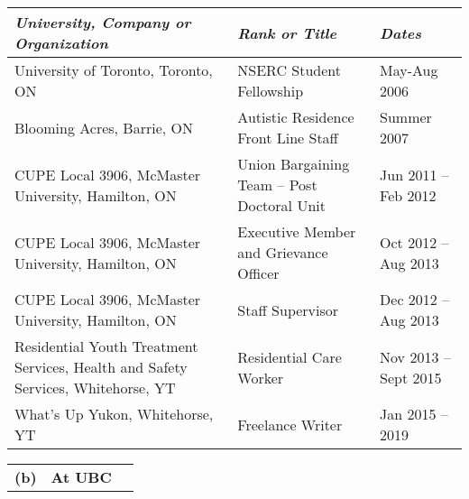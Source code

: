 \documentclass[11pt,notitlepage,english]{report}
\begin{document}
\begin{table}[H]
  \label{6. Employment Record}
  \begin{tabularx}{1\textwidth}{|p{8cm}|p{5cm}|X|}
    \hline
    \textit{University, Company or Organization}                                     & \textit{Rank or Title}                     & \textit{Dates}       \\
    \hline
    University of Toronto, Toronto, ON                                               & NSERC Student Fellowship                   & May-Aug 2006         \\
    \hline
    Blooming Acres, Barrie, ON                                                       & Autistic Residence Front Line Staff        & Summer 2007          \\
    \hline
    CUPE Local 3906, McMaster University, Hamilton, ON                               & Union Bargaining Team – Post Doctoral Unit & Jun 2011 – Feb 2012  \\
    \hline
    CUPE Local 3906, McMaster University, Hamilton, ON                               & Executive Member and Grievance Officer     & Oct 2012 – Aug 2013  \\
    \hline
    CUPE Local 3906, McMaster University, Hamilton, ON                               & Staff Supervisor                           & Dec 2012 – Aug 2013  \\
    \hline
    Residential Youth Treatment Services, Health and Safety Services, Whitehorse, YT & Residential Care Worker                    & Nov 2013 – Sept 2015 \\
    \hline
    What’s Up Yukon, Whitehorse, YT                                                  & Freelance Writer                           & Jan 2015 – 2019      \\
    \hline
  \end{tabularx}
\end{table}


\begin{tabular}{L{.5cm} L{8cm} L{6.9cm}}
  \textbf{(b)} & \textbf{At UBC} \\
\end{tabular}
\end{document}
